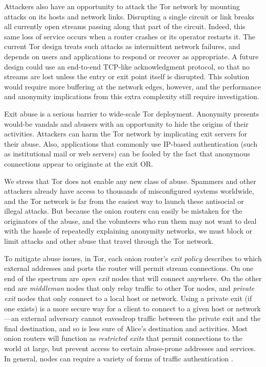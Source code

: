 \documentclass[times,10pt,twocolumn]{article}
\begin{document}

Attackers also have an opportunity to attack the Tor network by mounting
attacks on its hosts and network links. Disrupting a single circuit or
link breaks all currently open streams passing along that part of the
circuit. Indeed, this same loss of service occurs when a router crashes
or its operator restarts it. The current Tor design treats such attacks
as intermittent network failures, and depends on users and applications
to respond or recover as appropriate. A future design could use an
end-to-end TCP-like acknowledgment protocol, so that no streams are
lost unless the entry or exit point itself is disrupted. This solution
would require more buffering at the network edges, however, and the
performance and anonymity implications from this extra complexity still
require investigation.

\label{subsec:exitpolicies}


Exit abuse is a serious barrier to wide-scale Tor deployment. Anonymity
presents would-be vandals and abusers with an opportunity to hide
the origins of their activities. Attackers can harm the Tor network by
implicating exit servers for their abuse. Also, applications that commonly
use IP-based authentication (such as institutional mail or web servers)
can be fooled by the fact that anonymous connections appear to originate
at the exit OR.

We stress that Tor does not enable any new class of abuse. Spammers
and other attackers already have access to thousands of misconfigured
systems worldwide, and the Tor network is far from the easiest way
to launch these antisocial or illegal attacks.
But because the
onion routers can easily be mistaken for the originators of the abuse,
and the volunteers who run them may not want to deal with the hassle of
repeatedly explaining anonymity networks, we must block or limit attacks
and other abuse that travel through the Tor network.

To mitigate abuse issues, in Tor, each onion router's \emph{exit policy}
describes to which external addresses and ports the router will permit
stream connections. On one end of the spectrum are \emph{open exit}
nodes that will connect anywhere. On the other end are \emph{middleman}
nodes that only relay traffic to other Tor nodes, and \emph{private exit}
nodes that only connect to a local host or network.  Using a private
exit (if one exists) is a more secure way for a client to connect to a
given host or network---an external adversary cannot eavesdrop traffic
between the private exit and the final destination, and so is less sure of
Alice's destination and activities. Most onion routers will function as
\emph{restricted exits} that permit connections to the world at large,
but prevent access to certain abuse-prone addresses and services. In
general, nodes can require a variety of forms of traffic authentication
\cite{or-discex00}.
\end{document}
